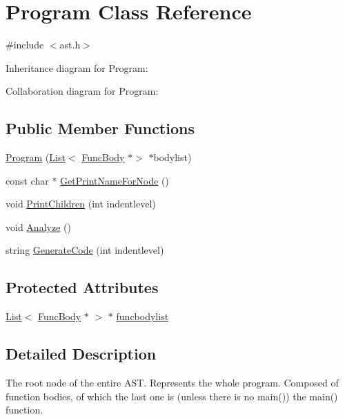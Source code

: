 \hypertarget{class_program}{}\section{Program Class Reference}
\label{class_program}


{\ttfamily \#include $<$ast.\+h$>$}



Inheritance diagram for Program\+:


Collaboration diagram for Program\+:
\subsection*{Public Member Functions}
\begin{DoxyCompactItemize}
\item 
\hyperlink{class_program_a0084186bdb7fd8259b3adfbc89a24128}{Program} (\hyperlink{class_list}{List}$<$ \hyperlink{class_func_body}{Func\+Body} $\ast$$>$ $\ast$bodylist)
\item 
const char $\ast$ \hyperlink{class_program_a42317e4371887f452b38b7a729a7533c}{Get\+Print\+Name\+For\+Node} ()
\item 
void \hyperlink{class_program_a70520a269a65d735e10c6f28acf075ad}{Print\+Children} (int indentlevel)
\item 
void \hyperlink{class_program_a7a533446b23a020e661463df819ae49d}{Analyze} ()
\item 
string \hyperlink{class_program_a4e709dc5cee7a2c28fe3d96694449c59}{Generate\+Code} (int indentlevel)
\end{DoxyCompactItemize}
\subsection*{Protected Attributes}
\begin{DoxyCompactItemize}
\item 
\hyperlink{class_list}{List}$<$ \hyperlink{class_func_body}{Func\+Body} $\ast$ $>$ $\ast$ \hyperlink{class_program_ab1c6f9b96b35cf94504ed2aa30cfb692}{funcbodylist}
\end{DoxyCompactItemize}


\subsection{Detailed Description}
The root node of the entire A\+ST. Represents the whole program. Composed of function bodies, of which the last one is (unless there is no main()) the main() function. 

